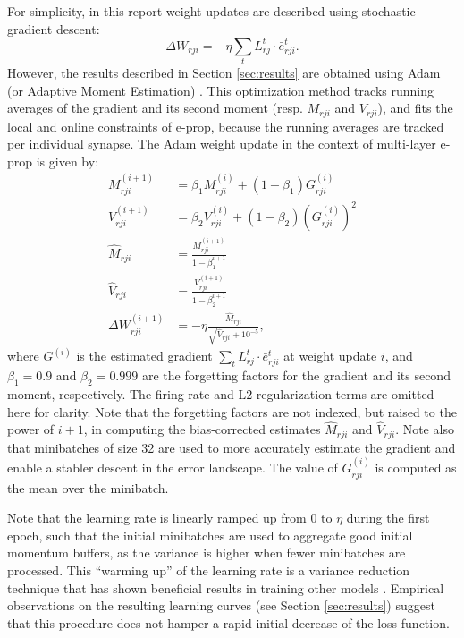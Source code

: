 	For simplicity, in this report weight updates are described using stochastic gradient descent:
	\begin{equation}
		\Delta W_{rji} = -\eta \sum_t L^t_{rj}\cdot\bar{e}^t_{rji}.
	\end{equation}
	However, the results described in Section \ref{sec:results} are obtained using Adam (or Adaptive Moment Estimation) \citep{kingma2014adam}.
	This optimization method tracks running averages of the gradient and its second moment (resp. $M_{rji}$ and $V_{rji}$), and fits the local and online constraints of e-prop, because the running averages are tracked per individual synapse.
	The Adam weight update in the context of multi-layer e-prop is given by:
	\begin{align}
	M_{rji}^{(i+1)} &= \beta_1 M_{rji}^{(i)} + \left(1 - \beta_1\right)G^{(i)}_{rji} \\
	V_{rji}^{(i+1)} &= \beta_2 V_{rji}^{(i)} + \left(1 - \beta_2\right)\left(G^{(i)}_{rji}\right)^2 \\
	\widehat{M}_{rji} &= \frac{M_{rji}^{(i+1)}}{1 - \beta_1^{i+1}} \\
	\widehat{V}_{rji} &= \frac{V_{rji}^{(i+1)}}{1 - \beta_2^{i+1}} \\
	\Delta W_{rji}^{(i+1)} &= -\eta \frac{\widehat{M}_{rji}}{\sqrt{\widehat{V}_{rji}} + 10^{-5}},
	\end{align}
	where $G^{(i)}$ is the estimated gradient $\sum_t L^t_{rj}\cdot\bar{e}^t_{rji}$ at weight update $i$, and $\beta_1=0.9$ and $\beta_2=0.999$ are the forgetting factors for the gradient and its second moment, respectively.
	The firing rate and L2 regularization terms are omitted here for clarity.
	Note that the forgetting factors are not indexed, but raised to the power of $i+1$, in computing the bias-corrected estimates $\widehat{M}_{rji}$ and $\widehat{V}_{rji}$.
	Note also that minibatches of size 32 are used to more accurately estimate the gradient and enable a stabler descent in the error landscape.
	The value of $G^{(i)}_{rji}$ is computed as the mean over the minibatch.

	Note that the learning rate is linearly ramped up from 0 to $\eta$ during the first epoch, such that the initial minibatches are used to aggregate good initial momentum buffers, as the variance is higher when fewer minibatches are processed.
	This ``warming up'' of the learning rate is a variance reduction technique that has shown beneficial results in training other models \citep{liu2019variance}.
	Empirical observations on the resulting learning curves (see Section \ref{sec:results}) suggest that this procedure does not hamper a rapid initial decrease of the loss function.
